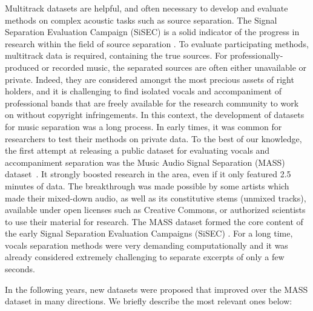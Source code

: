 Multitrack datasets are helpful, and often necessary to develop and evaluate methods on complex acoustic tasks such as source separation.
The Signal Separation Evaluation Campaign (SiSEC) is a solid indicator of the progress in research within the field of source separation \cite{sisec13, ono15, liutkus17, stoeter18sisec}.
To evaluate participating methods, multitrack data is required, containing the true sources.
For professionally-produced or recorded music, the separated sources are often either unavailable or private. 
Indeed, they are considered amongst the most precious assets of right holders, and it is challenging to find isolated vocals and accompaniment of professional bands that are freely available for the research community to work on without copyright infringements.
In this context, the development of datasets for music separation was a long process. 
In early times, it was common for researchers to test their methods on private data. 
To the best of our knowledge, the first attempt at releasing a public dataset for evaluating vocals and accompaniment separation was the Music Audio Signal Separation (MASS) dataset~\cite{MTGMASSdb}.
It strongly boosted research in the area, even if it only featured 2.5 minutes of data. The breakthrough was made possible by some artists which made their mixed-down audio, as well as its constitutive stems (unmixed tracks), available under open licenses such as Creative Commons, or authorized scientists to use their material for research.
% 
The MASS dataset formed the core content of the early Signal Separation Evaluation Campaigns (SiSEC) \cite{vincent09}. 
For a long time, vocals separation methods were very demanding computationally and it was already considered extremely challenging to separate excerpts of only a few seconds.

In the following years, new datasets were proposed that improved over the MASS dataset in many directions. 
We briefly describe the most relevant ones below:

